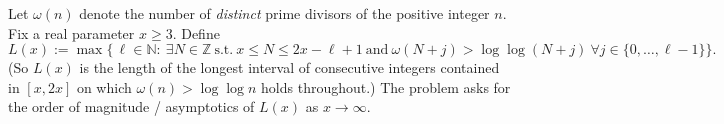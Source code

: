 Let $\omega(n)$ denote the number of \emph{distinct} prime divisors of the positive integer $n$.
Fix a real parameter $x\ge 3$. Define
\[
L(x):=\max\Big\{\,\ell\in\mathbb N:\ \exists N\in\mathbb Z\ \text{s.t.}\ x\le N\le 2x-\ell+1\ \text{and}\ \omega(N+j)>\log\log(N+j)\ \forall j\in\{0,\dots,\ell-1\}\Big\}.
\]
(So $L(x)$ is the length of the longest interval of consecutive integers contained in $[x,2x]$ on which $\omega(n)>\log\log n$ holds throughout.) The problem asks for the order of magnitude / asymptotics of $L(x)$ as $x\to\infty$.
